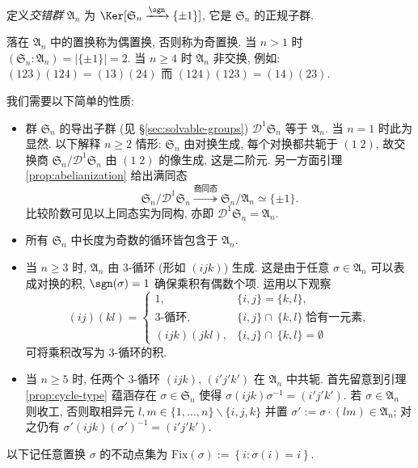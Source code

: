 \begin{definition}[交错群]
	定义\emph{交错群} $\mathfrak{A}_n$ 为 $\Ker[ \mathfrak{S}_n \xrightarrow{\sgn} \{\pm 1\}]$, 它是 $\mathfrak{S}_n$ 的正规子群.
\end{definition}
落在 $\mathfrak{A}_n$ 中的置换称为偶置换, 否则称为奇置换. 当 $n > 1$ 时 $(\mathfrak{S}_n : \mathfrak{A}_n) = |\{\pm 1\}| = 2$. 当 $n \geq 4$ 时 $\mathfrak{A}_n$ 非交换, 例如: $(1 2 3)(1 2 4) = (1 3) (2 4)$ 而 $(1 2 4)(1 2 3) = (1 4) (2 3)$.

我们需要以下简单的性质:
\begin{itemize}
	\item 群 $\mathfrak{S}_n$ 的导出子群 (见 \S\ref{sec:solvable-groups}) $\mathscr{D}^1 \mathfrak{S}_n$ 等于 $\mathfrak{A}_n$. 当 $n=1$ 时此为显然. 以下解释 $n \geq 2$ 情形: $\mathfrak{S}_n$ 由对换生成, 每个对换都共轭于 $(1 \; 2)$, 故交换商 $\mathfrak{S}_n / \mathscr{D}^1 \mathfrak{S}_n$ 由 $(1 \; 2)$ 的像生成, 这是二阶元. 另一方面引理 \ref{prop:abelianization} 给出满同态
		\[ \mathfrak{S}_n / \mathscr{D}^1 \mathfrak{S}_n \stackrel{\text{商同态}}{\twoheadrightarrow} \mathfrak{S}_n/\mathfrak{A}_n \simeq \{ \pm 1\}. \]
		比较阶数可见以上同态实为同构, 亦即 $\mathscr{D}^1 \mathfrak{S}_n = \mathfrak{A}_n$.
	\item 所有 $\mathfrak{S}_n$ 中长度为奇数的循环皆包含于 $\mathfrak{A}_n$.
	\item 当 $n \geq 3$ 时, $\mathfrak{A}_n$ 由 $3$-循环 (形如 $(i j k)$) 生成. 这是由于任意 $\sigma \in \mathfrak{A}_n$ 可以表成对换的积, $\sgn(\sigma)=1$ 确保乘积有偶数个项. 运用以下观察
		\[ (i j)(k l) = \begin{cases}
			1, & \{i,j\} = \{k,l\}, \\
			\text{$3$-循环}, & \{i,j\} \cap \ \{k,l\}\; \text{恰有一元素}, \\
			(i j k) (j k l), & \{i,j\} \cap \ \{k,l\} = \emptyset
		\end{cases} \]
		可将乘积改写为 $3$-循环的积.
	\item 当 $n \geq 5$ 时, 任两个 $3$-循环 $(i j k)$, $(i' j' k')$ 在 $\mathfrak{A}_n$ 中共轭. 首先留意到引理 \ref{prop:cycle-type} 蕴涵存在 $\sigma \in \mathfrak{S}_n$ 使得 $\sigma (i j k) \sigma^{-1} = (i' j' k')$. 若 $\sigma \in \mathfrak{A}_n$ 则收工, 否则取相异元 $l, m \in \{1, \ldots, n\} \smallsetminus \{i,j,k\}$ 并置 $\sigma' := \sigma \cdot (l m) \in \mathfrak{A}_n$; 对之仍有 $\sigma' (i j k) (\sigma')^{-1} = (i' j' k')$.
\end{itemize}
以下记任意置换 $\sigma$ 的不动点集为 $\text{Fix}(\sigma) := \left\{ i: \sigma(i)=i \right\}$.

